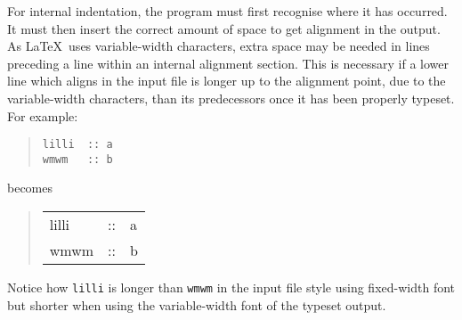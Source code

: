 For internal indentation, the program must first recognise where it has 
occurred.  It must then insert the correct amount of space to get alignment
in the output.  As \LaTeX\ uses variable-width characters, extra space
may be needed in lines preceding a line within an internal alignment section.  
This is necessary if a lower line which 
aligns in the input file is longer up to the alignment point,
due to the variable-width characters, than its predecessors 
once it has been properly typeset.  For example:
\begin{quote}
\begin{verbatim}
lilli  :: a
wmwm   :: b
\end{verbatim}
\end{quote}
becomes
\begin{quote}
\begin{tabular}[t]{@{}l@{\ }c@{\ }l}
lilli & :: & a\\
wmwm  & :: & b\\
\end{tabular}
\end{quote}
Notice how {\tt lilli} is longer than {\tt wmwm} in the input file style
using fixed-width font but shorter when using the variable-width font
of the typeset output.
